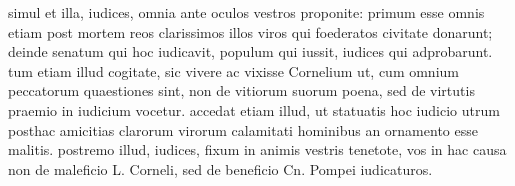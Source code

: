  simul et illa, iudices, omnia ante oculos vestros proponite: primum esse omnis etiam post mortem reos clarissimos illos viros qui foederatos civitate donarunt; deinde senatum qui hoc iudicavit, populum qui iussit, iudices qui adprobarunt. tum etiam illud cogitate, sic vivere ac vixisse Cornelium ut, cum omnium peccatorum quaestiones sint, non de vitiorum suorum poena, sed de virtutis praemio in iudicium vocetur. accedat etiam illud, ut statuatis hoc iudicio utrum posthac amicitias clarorum virorum calamitati hominibus an ornamento esse malitis. postremo illud, iudices, fixum in animis vestris tenetote, vos in hac causa non de maleficio L. Corneli, sed de beneficio Cn. Pompei iudicaturos.
